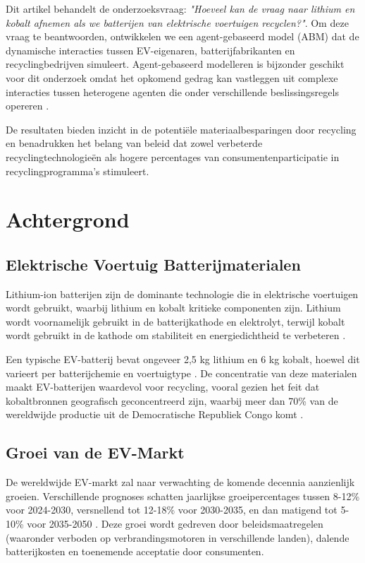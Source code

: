 \documentclass[10pt,a4paper,twocolumn]{article}
\begin{document}
Dit artikel behandelt de onderzoeksvraag: \textit{"Hoeveel kan de vraag naar lithium en kobalt afnemen als we batterijen van elektrische voertuigen recyclen?"}. Om deze vraag te beantwoorden, ontwikkelen we een agent-gebaseerd model (ABM) dat de dynamische interacties tussen EV-eigenaren, batterijfabrikanten en recyclingbedrijven simuleert. Agent-gebaseerd modelleren is bijzonder geschikt voor dit onderzoek omdat het opkomend gedrag kan vastleggen uit complexe interacties tussen heterogene agenten die onder verschillende beslissingsregels opereren \citep{bonabeau2002}.

De resultaten bieden inzicht in de potentiële materiaalbesparingen door recycling en benadrukken het belang van beleid dat zowel verbeterde recyclingtechnologieën als hogere percentages van consumentenparticipatie in recyclingprogramma's stimuleert.

\section{Achtergrond}
\label{sec:background}

\subsection{Elektrische Voertuig Batterijmaterialen}

Lithium-ion batterijen zijn de dominante technologie die in elektrische voertuigen wordt gebruikt, waarbij lithium en kobalt kritieke componenten zijn. Lithium wordt voornamelijk gebruikt in de batterijkathode en elektrolyt, terwijl kobalt wordt gebruikt in de kathode om stabiliteit en energiedichtheid te verbeteren \citep{xu2017}.

Een typische EV-batterij bevat ongeveer 2,5 kg lithium en 6 kg kobalt, hoewel dit varieert per batterijchemie en voertuigtype \citep{ellingsen2016}. De concentratie van deze materialen maakt EV-batterijen waardevol voor recycling, vooral gezien het feit dat kobaltbronnen geografisch geconcentreerd zijn, waarbij meer dan 70\% van de wereldwijde productie uit de Democratische Republiek Congo komt \citep{usgs2020}.

\subsection{Groei van de EV-Markt}

De wereldwijde EV-markt zal naar verwachting de komende decennia aanzienlijk groeien. Verschillende prognoses schatten jaarlijkse groeipercentages tussen 8-12\% voor 2024-2030, versnellend tot 12-18\% voor 2030-2035, en dan matigend tot 5-10\% voor 2035-2050 \citep{elaadoutlook}. Deze groei wordt gedreven door beleidsmaatregelen (waaronder verboden op verbrandingsmotoren in verschillende landen), dalende batterijkosten en toenemende acceptatie door consumenten.
\end{document}
